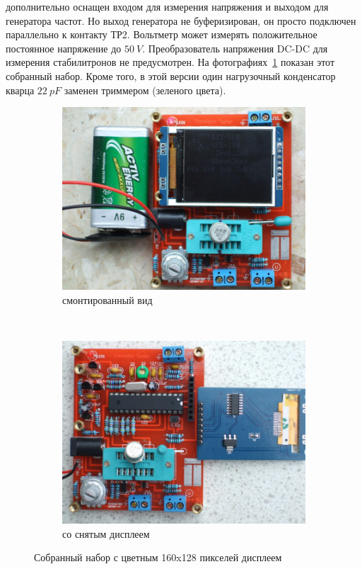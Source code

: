 дополнительно оснащен входом для измерения напряжения и выходом для генератора частот.
Но выход генератора не буферизирован, он просто подключен параллельно к контакту ТР2.
Вольтметр может измерять положительное постоянное  напряжение до \(50~V\).
Преобразователь напряжения DC-DC для измерения стабилитронов не предусмотрен.
На фотографиях~\ref{fig:Kit_color} показан этот собранный набор.
Кроме того, в этой версии один нагрузочный конденсатор кварца \(22~pF\) заменен триммером (зеленого цвета).
\begin{figure}[H]
  \begin{subfigure}[b]{.5\textwidth}
    \centering
    \includegraphics[width=1.\textwidth]{../PNG/Kit_Color_a.jpg}
    \caption{смонтированный вид}
  \end{subfigure}
  ~
  \begin{subfigure}[b]{.5\textwidth}
    \centering
    \includegraphics[width=1.\textwidth]{../PNG/Kit_Color_b.jpg}
    \caption{со снятым дисплеем}
  \end{subfigure}
  \caption{Собранный набор с цветным 160x128 пикселей дисплеем}
  \label{fig:Kit_color}
\end{figure}
